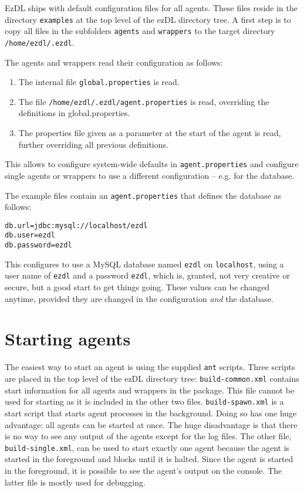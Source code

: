 \documentclass[12pt]{book}
\begin{document}
EzDL ships with default configuration files for all agents. These files reside in the directory {\tt examples} at the top level of the ezDL directory tree. A first step is to copy all files in the subfolders {\tt agents} and {\tt wrappers} to the target directory {\tt /home/ezdl/.ezdl}.

The agents and wrappers read their configuration as follows:

\begin{enumerate}
\item The internal file {\tt global.properties} is read.
\item The file {\tt /home/ezdl/.ezdl/agent.properties} is read, overriding the definitions in global.properties.
\item The properties file given as a parameter at the start of the agent is read, further overriding all previous definitions. 
\end{enumerate}

This allows to configure system-wide defaults in {\tt agent.properties} and configure single agents or wrappers to use a different configuration -- e.g. for the database.

The example files contain an {\tt agent.properties} that defines the database as follows:

\begin{verbatim}
db.url=jdbc:mysql://localhost/ezdl
db.user=ezdl
db.password=ezdl
\end{verbatim}

This configures to use a MySQL database named {\tt ezdl} on {\tt localhost}, using a user name of {\tt ezdl} and a password {\tt ezdl}, which is, granted, not very creative or secure, but a good start to get things going. These values can be changed anytime, provided they are changed in the configuration {\it and} the database.



\section{Starting agents}

The easiest way to start an agent is using the supplied {\tt ant} scripts. Three scripts are placed in the top level of the ezDL directory tree: {\tt build-common.xml} contains start information for all agents and wrappers in the package. This file cannot be used for starting as it is included in the other two files. {\tt build-spawn.xml} is a start script that starts agent processes in the background. Doing so has one huge advantage: all agents can be started at once. The huge disadvantage is that there is no way to see any output of the agents except for the log files. The other file, {\tt build-single.xml}, can be used to start exactly one agent because the agent is started in the foreground and blocks until it is halted. Since the agent is started in the foreground, it is possible to see the agent's output on the console. The latter file is mostly used for debugging.
\end{document}
